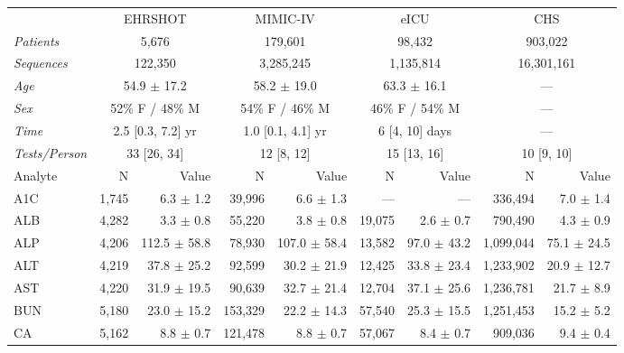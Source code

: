 \begin{table}[ht]
\centering
\footnotesize
\begin{tabular}{lrrrrrrrr}
\toprule
  & \multicolumn{2}{c}{EHRSHOT} & \multicolumn{2}{c}{MIMIC-IV} & \multicolumn{2}{c}{eICU} & \multicolumn{2}{c}{CHS} \\
\cmidrule(lr){2-3} \cmidrule(lr){4-5} \cmidrule(lr){6-7} \cmidrule(lr){8-9}
\textit{Patients} & \multicolumn{2}{c}{5,676} & \multicolumn{2}{c}{179,601} & \multicolumn{2}{c}{98,432} & \multicolumn{2}{c}{903,022} \\
\textit{Sequences} & \multicolumn{2}{c}{122,350} & \multicolumn{2}{c}{3,285,245} & \multicolumn{2}{c}{1,135,814} & \multicolumn{2}{c}{16,301,161} \\
\textit{Age} & \multicolumn{2}{c}{54.9 $\pm$ 17.2} & \multicolumn{2}{c}{58.2 $\pm$ 19.0} & \multicolumn{2}{c}{63.3 $\pm$ 16.1} & \multicolumn{2}{c}{---} \\
\textit{Sex} & \multicolumn{2}{c}{52\% F / 48\% M} & \multicolumn{2}{c}{54\% F / 46\% M} & \multicolumn{2}{c}{46\% F / 54\% M} & \multicolumn{2}{c}{---} \\
\textit{Time} & \multicolumn{2}{c}{2.5 [0.3, 7.2] yr} & \multicolumn{2}{c}{1.0 [0.1, 4.1] yr} & \multicolumn{2}{c}{6 [4, 10] days} & \multicolumn{2}{c}{---} \\
\textit{Tests/Person} & \multicolumn{2}{c}{33 [26, 34]} & \multicolumn{2}{c}{12 [8, 12]} & \multicolumn{2}{c}{15 [13, 16]} & \multicolumn{2}{c}{10 [9, 10]} \\
\midrule
Analyte & N & Value & N & Value & N & Value & N & Value \\
\midrule
A1C & 1,745 & 6.3 $\pm$ 1.2 & 39,996 & 6.6 $\pm$ 1.3 & — & --- & 336,494 & 7.0 $\pm$ 1.4 \\
ALB & 4,282 & 3.3 $\pm$ 0.8 & 55,220 & 3.8 $\pm$ 0.8 & 19,075 & 2.6 $\pm$ 0.7 & 790,490 & 4.3 $\pm$ 0.9 \\
ALP & 4,206 & 112.5 $\pm$ 58.8 & 78,930 & 107.0 $\pm$ 58.4 & 13,582 & 97.0 $\pm$ 43.2 & 1,099,044 & 75.1 $\pm$ 24.5 \\
ALT & 4,219 & 37.8 $\pm$ 25.2 & 92,599 & 30.2 $\pm$ 21.9 & 12,425 & 33.8 $\pm$ 23.4 & 1,233,902 & 20.9 $\pm$ 12.7 \\
AST & 4,220 & 31.9 $\pm$ 19.5 & 90,639 & 32.7 $\pm$ 21.4 & 12,704 & 37.1 $\pm$ 25.6 & 1,236,781 & 21.7 $\pm$ 8.9 \\
BUN & 5,180 & 23.0 $\pm$ 15.2 & 153,329 & 22.2 $\pm$ 14.3 & 57,540 & 25.3 $\pm$ 15.5 & 1,251,453 & 15.2 $\pm$ 5.2 \\
CA & 5,162 & 8.8 $\pm$ 0.7 & 121,478 & 8.8 $\pm$ 0.7 & 57,067 & 8.4 $\pm$ 0.7 & 909,036 & 9.4 $\pm$ 0.4 \\

\end{tabular}
\end{table}
